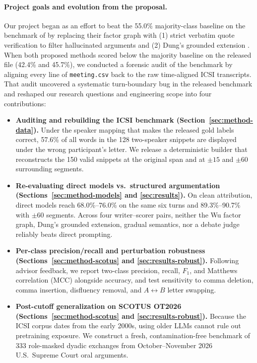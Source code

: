 \documentclass[11pt]{article}
\begin{document}
\paragraph{Project goals and evolution from the proposal.}
Our project began as an effort to beat the 55.0\% majority-class baseline on the benchmark of \citet{wu2025power} by replacing their factor graph with (1) strict verbatim quote verification to filter hallucinated arguments and (2) Dung's grounded extension \citep{dung1995acceptability}.
When both proposed methods scored below the majority baseline on the released file (42.4\% and 45.7\%), we conducted a forensic audit of the benchmark by aligning every line of \texttt{meeting.csv} back to the raw time-aligned ICSI transcripts.
That audit uncovered a systematic turn-boundary bug in the released benchmark and reshaped our research questions and engineering scope into four contributions:
\begin{itemize}
\setlength\itemsep{1pt}
\item \textbf{Auditing and rebuilding the ICSI benchmark (Section~\ref{sec:method-data}).} Under the speaker mapping that makes the released gold labels correct, 57.6\% of all words in the 128 two-speaker snippets are displayed under the wrong participant's letter. We release a deterministic builder that reconstructs the 150 valid snippets at the original span and at $\pm 15$ and $\pm 60$ surrounding segments.
\item \textbf{Re-evaluating direct models vs.\ structured argumentation (Sections~\ref{sec:method-models} and \ref{sec:results}).} On clean attribution, direct models reach 68.0\%--76.0\% on the same six turns and 89.3\%--90.7\% with $\pm 60$ segments. Across four writer--scorer pairs, neither the Wu factor graph, Dung's grounded extension, gradual semantics, nor a debate judge reliably beats direct prompting.
\item \textbf{Per-class precision/recall and perturbation robustness (Sections~\ref{sec:method-scotus} and \ref{sec:results-robust}).} Following advisor feedback, we report two-class precision, recall, $F_1$, and Matthews correlation (MCC) alongside accuracy, and test sensitivity to comma deletion, comma insertion, disfluency removal, and $A \leftrightarrow B$ letter swapping.
\item \textbf{Post-cutoff generalization on SCOTUS OT2026 (Sections~\ref{sec:method-scotus} and \ref{sec:results-robust}).} Because the ICSI corpus dates from the early 2000s, using older LLMs cannot rule out pretraining exposure. We construct a fresh, contamination-free benchmark of 333 role-masked dyadic exchanges from October--November 2026 U.S.\ Supreme Court oral arguments.
\end{itemize}
\end{document}
